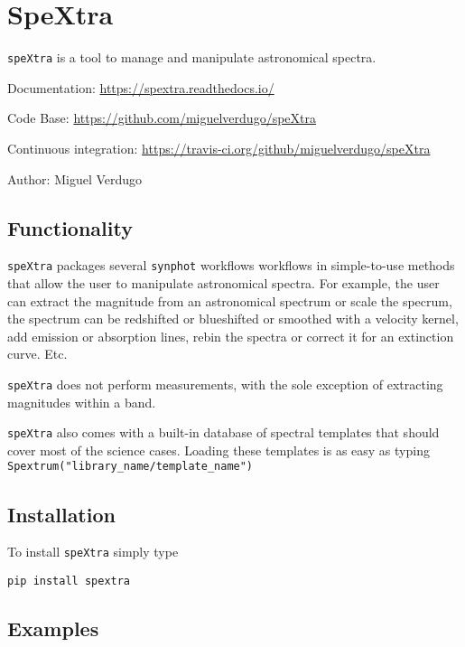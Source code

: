 

\section{SpeXtra%
  \label{spextra}%
}

\texttt{speXtra} is a tool to manage and manipulate astronomical spectra. 

Documentation: \url{https://spextra.readthedocs.io/}

Code Base: \url{https://github.com/miguelverdugo/speXtra}

Continuous integration: \url{https://travis-ci.org/github/miguelverdugo/speXtra}

Author: Miguel Verdugo


\subsection{Functionality%
  \label{functionality}%
}

\texttt{speXtra} packages several \texttt{synphot} workflows
workflows in simple-to-use methods that allow the user 
to manipulate astronomical spectra. For example, the user
can extract the magnitude from an astronomical spectrum or 
scale the specrum, the spectrum can be redshifted or 
blueshifted or smoothed with a velocity kernel, add emission or
absorption lines, rebin the spectra or correct it for an
extinction curve. Etc.

\texttt{speXtra} does not perform measurements, with the sole 
exception of extracting magnitudes within a band. 

\texttt{speXtra} also comes with a built-in database of spectral templates 
that should cover most of the science cases. Loading these templates is as
easy as typing \texttt{Spextrum("library_name/template_name")}



\subsection{Installation}

To install \texttt{speXtra} simply type

\texttt{pip install spextra}

 


\subsection{Examples%
  \label{examples}%
}
